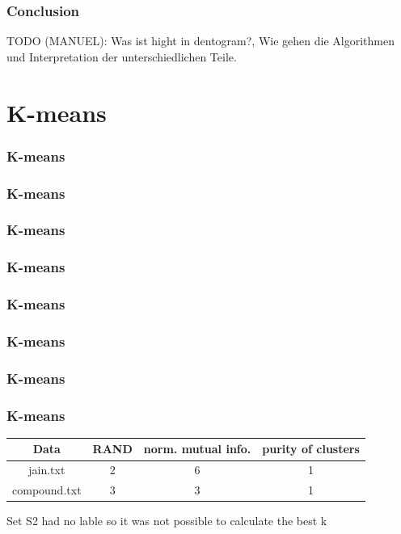 \documentclass[xcolor={usenames,dvipsnames}, 
	hyperref={
	colorlinks=true, 						%
	linkcolor=black, 						%
	urlcolor=black,							%
	citecolor=black,						%
	pdfpagelabels=false,
	},
	ignorenonframetext,			%
	compress					%
]{beamer}
\begin{document}
\begin{frame}
   \frametitle{Conclusion}
TODO (MANUEL): Was ist hight in dentogram?, Wie gehen die Algorithmen und Interpretation der unterschiedlichen Teile.
\end{frame}



\section{K-means}
\begin{frame}
   \frametitle{K-means}

\end{frame}

\begin{frame}
   \frametitle{K-means}

\end{frame}

\begin{frame}
   \frametitle{K-means}

\end{frame}

\begin{frame}
   \frametitle{K-means}

\end{frame}

\begin{frame}
   \frametitle{K-means}

\end{frame}

\begin{frame}
   \frametitle{K-means}

\end{frame}

\begin{frame}
   \frametitle{K-means}

\end{frame}

\begin{frame}
   \frametitle{K-means}
\begin{center}
  \begin{tabular}{ c | c | c | c }
    Data & RAND & norm. mutual info. & purity of clusters \\ 
    \hline
    jain.txt & 2 & 6 & 1 \\
    compound.txt & 3 & 3 & 1 \\
  \end{tabular}
\end{center}
Set S2 had no lable so it was not possible to calculate the best k
\end{frame}
\end{document}
